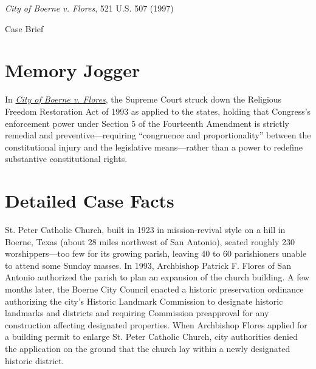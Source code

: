 \documentclass[12pt]{article}
\begin{document}
\begin{center}
{\LARGE \textit{City of Boerne v. Flores}, 521 U.S. 507 (1997)\par}
\vspace{0.8em}
{\large Case Brief\par}
\end{center}
\vspace{1em}

\section{Memory Jogger}

In \href{https://www.courtlistener.com/opinion/118140/city-of-boerne-v-flores/}{\textit{City of Boerne v. Flores}}, the Supreme Court struck down the Religious Freedom Restoration Act of 1993 as applied to the states, holding that Congress's enforcement power under Section 5 of the Fourteenth Amendment is strictly remedial and preventive---requiring ``congruence and proportionality'' between the constitutional injury and the legislative means---rather than a power to redefine substantive constitutional rights.

\section{Detailed Case Facts}

St. Peter Catholic Church, built in 1923 in mission-revival style on a hill in Boerne, Texas (about 28 miles northwest of San Antonio), seated roughly 230 worshippers---too few for its growing parish, leaving 40 to 60 parishioners unable to attend some Sunday masses. In 1993, Archbishop Patrick F. Flores of San Antonio authorized the parish to plan an expansion of the church building. A few months later, the Boerne City Council enacted a historic preservation ordinance authorizing the city's Historic Landmark Commission to designate historic landmarks and districts and requiring Commission preapproval for any construction affecting designated properties. When Archbishop Flores applied for a building permit to enlarge St. Peter Catholic Church, city authorities denied the application on the ground that the church lay within a newly designated historic district.
\end{document}
